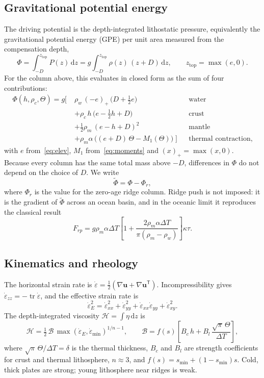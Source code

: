 \documentclass[11pt]{article}
\newcommand{\vect}[1]{\mathbf{#1}}
\newcommand{\edot}{\dot{\varepsilon}}
\newcommand{\dd}{\,\mathrm{d}}
\newcommand{\Hint}{\mathcal{H}}
\newcommand{\Bint}{\mathcal{B}}
\begin{document}
\subsection{Gravitational potential energy}
The driving potential is the depth-integrated lithostatic pressure, equivalently the gravitational potential energy (GPE) per unit area measured from the compensation depth,
\begin{equation}
  \Phi = \int_{-D}^{z_{\mathrm{top}}} P(z)\dd z = g\int_{-D}^{z_{\mathrm{top}}}\rho(z)\,(z+D)\dd z,
  \qquad z_{\mathrm{top}}=\max(e,0).
\end{equation}
For the column above, this evaluates in closed form as the sum of four contributions:
\begin{align}
  \Phi(h,\rho_c,\Theta) = g\Big[\;&\rho_w\,(-e)_+\,\big(D+\tfrac12 e\big) && \text{water}\nonumber\\
  &+\rho_c\,h\,\big(e-\tfrac12h+D\big) && \text{crust}\nonumber\\
  &+\tfrac12\rho_m\,(e-h+D)^2 && \text{mantle}\nonumber\\
  &+\rho_m\alpha\,\big((e+D)\,\Theta - M_1(\Theta)\big)\;\Big] && \text{thermal contraction},
  \label{eq:phi}
\end{align}
with $e$ from~\eqref{eq:elev}, $M_1$ from~\eqref{eq:moments} and $(x)_+=\max(x,0)$. Because every column has the same total mass above $-D$, differences in $\Phi$ do not depend on the choice of $D$. We write
\begin{equation}
  \tilde\Phi = \Phi - \Phi_r,
\end{equation}
where $\Phi_r$ is the value for the zero-age ridge column. Ridge push is not imposed: it is the gradient of $\tilde\Phi$ across an ocean basin, and in the oceanic limit it reproduces the classical result
\begin{equation}
  F_{rp} = g\rho_m\alpha\Delta T\left[1+\frac{2\rho_m\alpha\Delta T}{\pi(\rho_m-\rho_w)}\right]\kappa\tau .
  \label{eq:ridgepush}
\end{equation}

\subsection{Kinematics and rheology}
The horizontal strain rate is $\edot = \tfrac12(\nabla\vect{u}+\nabla\vect{u}^{\mathsf T})$. Incompressibility gives $\edot_{zz}=-\operatorname{tr}\edot$, and the effective strain rate is
\begin{equation}
  \edot_E^2 = \edot_{xx}^2+\edot_{yy}^2+\edot_{xx}\edot_{yy}+\edot_{xy}^2 .
\end{equation}
The depth-integrated viscosity $\Hint=\int\eta\dd z$ is
\begin{equation}
  \Hint = \tfrac12\,\Bint\,\max(\edot_E,\edot_{\min})^{1/n-1},\qquad
  \Bint = f(s)\left[B_c\,h + B_l\,\frac{\sqrt\pi\,\Theta}{\Delta T}\right],
  \label{eq:visc}
\end{equation}
where $\sqrt\pi\,\Theta/\Delta T=\delta$ is the thermal thickness, $B_c$ and $B_l$ are strength coefficients for crust and thermal lithosphere, $n\approx3$, and $f(s)=s_{\min}+(1-s_{\min})s$. Cold, thick plates are strong; young lithosphere near ridges is weak.
\end{document}
